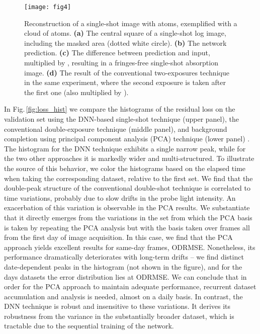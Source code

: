 \documentclass[twocolumn,groupedaddress,longbibliography]{revtex4-1}
\begin{document}
\begin{figure*}
\centering
\texttt{[image: fig4]}
\caption{Reconstruction of a single-shot image with atoms, exemplified with a cloud of  atoms.
	\textbf{(a)} The central square of a single-shot log image, including the masked area (dotted white circle).
	\textbf{(b)} The network prediction.
	\textbf{(c)} The difference between prediction and input, multiplied by , resulting in a fringes-free single-shot absorption image.
	\textbf{(d)} The result of the conventional two-exposures technique in the same experiment, where the second exposure is taken  after the first one (also multiplied by ).
}
\label{fig:with_atoms}
\end{figure*}

In Fig.\,\ref{fig:loss_hist} we compare the histograms of the residual loss on the validation set using the DNN-based single-shot technique (upper panel), the conventional double-exposure technique (middle panel), and background completion using principal component analysis (PCA) technique (lower panel) \cite{Niu2018}. The histogram for the DNN technique exhibits a single narrow peak, while for the two other approaches it is markedly wider and multi-structured. To illustrate the source of this behavior, we color the histograms based on the elapsed time when taking the corresponding dataset, relative to the first set. We find that the double-peak structure of the conventional double-shot technique is correlated to time variations, probably due to slow drifts in the probe light intensity. An exacerbation of this variation is observable in the PCA results. We substantiate that it directly emerges from the variations in the set from which the PCA basis is taken by repeating the PCA analysis but with the basis taken over  frames all from the first day of image acquisition. In this case, we find that the PCA approach yields excellent results for same-day frames,  ODRMSE. Nonetheless, its performance dramatically deteriorates with long-term drifts -- we find distinct date-dependent peaks in the histogram (not shown in the figure), and for the  days datasets the error distribution lies at  ODRMSE. We can conclude that in order for the PCA approach to maintain adequate performance, recurrent dataset accumulation and analysis is needed, almost on a daily basis. In contrast, the DNN technique is robust and insensitive to these variations. It derives its robustness from the variance in the substantially broader dataset, which is tractable due to the sequential training of the network.
\end{document}
